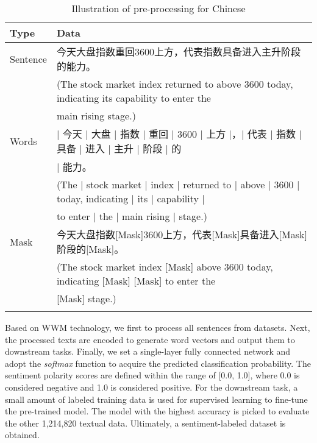 \documentclass[sn-mathphys]{sn-jnl}%
\theoremstyle{thmstyleone}%
\theoremstyle{thmstyletwo}%
\theoremstyle{thmstylethree}%
\begin{document}
\begin{CJK}{UTF8}{gbsn}
\renewcommand{\tablename}{Table}
\begin{table}[h]
	\begin{center}
		\begin{minipage}{\textwidth}
			\caption{Illustration of pre-processing for Chinese} \label{tab1}
			\begin{tabular}{@{\extracolsep{\fill}}ll@{\extracolsep{\fill}}}
				\toprule
				Type & Data \\
				\midrule
				Sentence & 今天大盘指数重回3600上方，代表指数具备进入主升阶段的能力。 \\
				 & (The stock market index returned to above 3600 today, indicating its capability to enter the\\
				 & main rising stage.) \\
				Words & $\vert$ 今天 $\vert$ 大盘 $\vert$ 指数 $\vert$ 重回 $\vert$ 3600 $\vert$ 上方 $\vert$，$\vert$ 代表 $\vert$ 指数 $\vert$ 具备 $\vert$ 进入 $\vert$ 主升 $\vert$ 阶段 $\vert$ 的 \\
 				 & $\vert$ 能力。 \\
				 & (The $\vert$ stock market $\vert$ index $\vert$ returned to $\vert$ above $\vert$ 3600 $\vert$ today, indicating $\vert$ its $\vert$ capability $\vert$  \\
				 & to enter $\vert$ the $\vert$ main rising $\vert$ stage.) \\
				Mask & 今天大盘指数[Mask]3600上方，代表[Mask]具备进入[Mask]阶段的[Mask]。 \\
				 & (The stock market index [Mask] above 3600 today, indicating [Mask] [Mask] to enter the \\
				 & [Mask] stage.) \\
				\botrule
			\end{tabular}
		\end{minipage}
	\end{center}
\end{table}
\end{CJK}

Based on WWM technology, we first to process all sentences from datasets. Next, the processed texts are encoded to generate word vectors and output them to downstream tasks. Finally, we set a single-layer fully connected network and adopt the \emph{softmax} function to acquire the predicted classification probability. The sentiment polarity scores are defined within the range of [0.0, 1.0], where 0.0 is considered negative and 1.0 is considered positive. For the downstream task, a small amount of labeled training data is used for supervised learning to fine-tune the pre-trained model. The model with the highest accuracy is picked to evaluate the other 1,214,820 textual data. Ultimately, a sentiment-labeled dataset is obtained.
\end{document}
